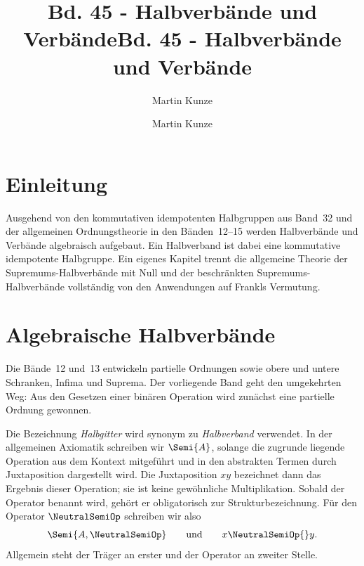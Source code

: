 \documentclass[main.tex]{subfiles}
\title{Bd. 45 - Halbverbände und Verbände}
\author{Martin Kunze}
\date{}
\begin{document}
\title{Bd. 45 - Halbverbände und Verbände}
\author{Martin Kunze}
\date{}
\hypersetup{pageanchor=false}
\maketitle
\hypersetup{pageanchor=true}
\setcounter{tocdepth}{3}
\tableofcontents
\setcounter{file}{45}
\renewcommand{\FormulaBandID}{45}
\newcommand{\ProofRefStack}[1]{%
  \ensuremath{\begin{gathered}[t]#1\end{gathered}}}



\chapter{Einleitung}

Ausgehend von den kommutativen idempotenten Halbgruppen aus Band~32 und der allgemeinen Ordnungstheorie
in den Bänden~12--15 werden Halbverbände und Verbände algebraisch aufgebaut. Ein
Halbverband ist dabei eine kommutative idempotente Halbgruppe. Ein eigenes
Kapitel trennt
die allgemeine Theorie der Supremums-Halbverbände mit Null und der
beschränkten Supremums-Halbverbände vollständig von den Anwendungen auf
Frankls Vermutung.

\chapter{Algebraische Halbverbände}

Die Bände~12 und~13 entwickeln partielle Ordnungen sowie obere und untere Schranken,
Infima und Suprema. Der vorliegende Band geht den umgekehrten Weg: Aus den
Gesetzen einer binären Operation wird zunächst eine partielle Ordnung
gewonnen.

Die Bezeichnung \emph{Halbgitter} wird synonym zu \emph{Halbverband}
verwendet. In der allgemeinen Axiomatik schreiben wir \(\Semi{A}\), solange
die zugrunde liegende Operation aus dem Kontext mitgeführt und in den
abstrakten Termen durch Juxtaposition dargestellt wird. Die Juxtaposition
\(xy\) bezeichnet dann das Ergebnis dieser Operation; sie ist keine
gewöhnliche Multiplikation. Sobald der Operator benannt wird, gehört er
obligatorisch zur Strukturbezeichnung. Für den Operator \(\NeutralSemiOp\)
schreiben wir also
\[
  \Semi{A,\NeutralSemiOp}
  \qquad\text{und}\qquad
  x\NeutralSemiOp{}y.
\]
Allgemein steht der Träger an erster und der Operator an zweiter Stelle.
\end{document}
